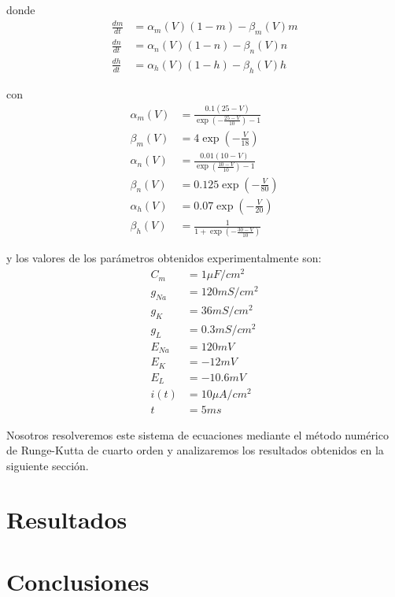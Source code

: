 \documentclass[aps,prl,reprint,groupedaddress]{revtex4-2}
\begin{document}
\newpage
donde 
\begin{align*}
    \frac{dm}{dt} &= \alpha_{m}(V)(1 - m) - \beta_{m}(V)m \\
    \frac{dn}{dt} &= \alpha_{n}(V)(1 - n) - \beta_{n}(V)n \\
    \frac{dh}{dt} &= \alpha_{h}(V)(1 - h) - \beta_{h}(V)h
\end{align*}

con 
\begin{align*}
    \alpha_{m}(V) &= \frac{0.1(25 - V)}{\exp\left(-\frac{25-V}{10}\right)-1} \\
    \beta_{m}(V) &= 4\exp\left(-\frac{V}{18}\right) \\
    \alpha_{n}(V) &= \frac{0.01(10 - V)}{\exp\left(\frac{10-V}{10}\right)-1} \\
    \beta_{n}(V) &= 0.125\exp\left(-\frac{V}{80}\right) \\
    \alpha_{h}(V) &= 0.07\exp\left(-\frac{V}{20}\right) \\
    \beta_{h}(V) &= \frac{1}{1 + \exp\left(-\frac{30-V}{10}\right)}
\end{align*}

y los valores de los parámetros obtenidos experimentalmente son:
\begin{align*}
    C_{m} &= 1 \mu F/cm^{2} \\
    g_{Na} &= 120 mS/cm^{2} \\
    g_{K} &= 36 mS/cm^{2} \\
    g_{L} &= 0.3 mS/cm^{2} \\
    E_{Na} &= 120 mV \\
    E_{K} &= -12 mV \\
    E_{L} &= -10.6 mV \\
    i(t) &= 10 \mu A/cm^{2}\\
    t &= 5 ms
\end{align*}

Nosotros resolveremos este sistema de ecuaciones mediante el método numérico de
Runge-Kutta de cuarto orden y analizaremos los resultados obtenidos en la
siguiente sección.

\section{Resultados}


\section{Conclusiones}





\end{document}
